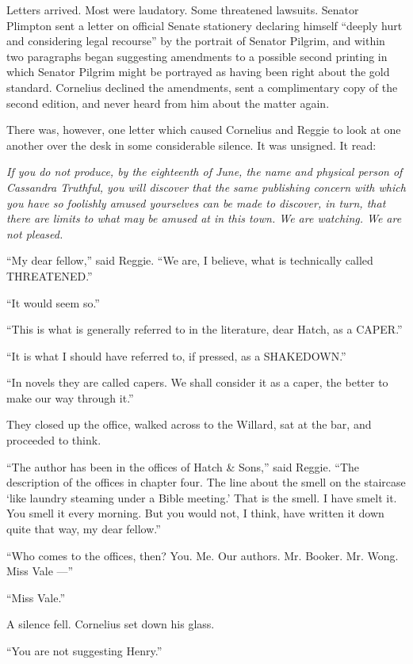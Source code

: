 \documentclass[12pt,openright]{book}
\begin{document}
Letters arrived. Most were laudatory. Some threatened lawsuits. Senator Plimpton sent a letter on official Senate stationery declaring himself “deeply hurt and considering legal recourse” by the portrait of Senator Pilgrim, and within two paragraphs began suggesting amendments to a possible second printing in which Senator Pilgrim might be portrayed as having been right about the gold standard. Cornelius declined the amendments, sent a complimentary copy of the second edition, and never heard from him about the matter again.

There was, however, one letter which caused Cornelius and Reggie to look at one another over the desk in some considerable silence. It was unsigned. It read:

\textit{If you do not produce, by the eighteenth of June, the name and physical person of Cassandra Truthful, you will discover that the same publishing concern with which you have so foolishly amused yourselves can be made to discover, in turn, that there are limits to what may be amused at in this town. We are watching. We are not pleased.}

“My dear fellow,” said Reggie. “We are, I believe, what is technically called THREATENED.”

“It would seem so.”

“This is what is generally referred to in the literature, dear Hatch, as a CAPER.”

“It is what I should have referred to, if pressed, as a SHAKEDOWN.”

“In novels they are called capers. We shall consider it as a caper, the better to make our way through it.”

They closed up the office, walked across to the Willard, sat at the bar, and proceeded to think.

“The author has been in the offices of Hatch \& Sons,” said Reggie. “The description of the offices in chapter four. The line about the smell on the staircase ‘like laundry steaming under a Bible meeting.’ That is the smell. I have smelt it. You smell it every morning. But you would not, I think, have written it down quite that way, my dear fellow.”

“Who comes to the offices, then? You. Me. Our authors. Mr. Booker. Mr. Wong. Miss Vale —”

“Miss Vale.”

A silence fell. Cornelius set down his glass.

“You are not suggesting Henry.”
\end{document}
